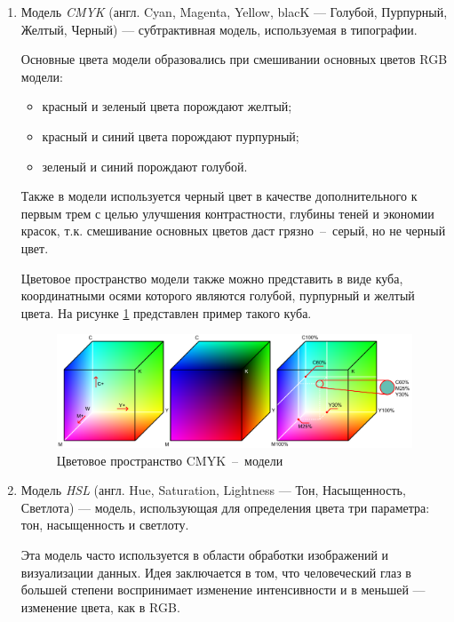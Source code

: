 \begin{enumerate}
	\clearpage
	
	\item Модель \textit{CMYK} (англ. Cyan, Magenta, Yellow, blacK --- Голубой, Пурпурный, Желтый, Черный) --- субтрактивная модель, используемая в типографии. 
	
	Основные цвета модели образовались при смешивании основных цветов RGB модели:
	
	\begin{itemize}
		\item красный и зеленый цвета порождают желтый;
		\item красный и синий цвета порождают пурпурный;
		\item зеленый и синий порождают голубой.
	\end{itemize}
	
	Также в модели используется черный цвет в качестве дополнительного к первым трем с целью улучшения контрастности, глубины теней и экономии красок, т.к. смешивание основных цветов даст грязно~--~серый, но не черный цвет. 
	
	Цветовое пространство модели также можно представить в виде куба, координатными осями которого являются голубой, пурпурный и желтый цвета. На рисунке \ref{cmyk_cube} представлен пример такого куба.
	
	\begin{figure}[H]
		\centering
		\includegraphics[scale=0.55]{assets/cmyk_color_cube.pdf}
		\caption{Цветовое пространство CMYK~--~модели}
		\label{cmyk_cube}
	\end{figure}

	\item Модель \textit{HSL} (англ. Hue, Saturation, Lightness --- Тон, Насыщенность, Светлота) --- модель, использующая для определения цвета три параметра: тон, насыщенность и светлоту. 
	
	Эта модель часто используется в области обработки изображений и визуализации данных. Идея заключается в том, что человеческий глаз в большей степени воспринимает изменение интенсивности и в меньшей --- изменение цвета, как в RGB.
	

\end{enumerate}
